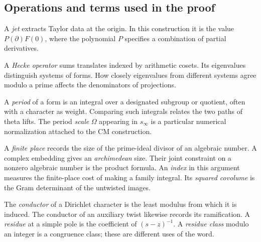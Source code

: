 \documentclass[11pt,letterpaper]{article}
\begin{document}
\subsection*{Operations and terms used in the proof}
A \emph{jet} extracts Taylor data at the origin. In this construction it is the value \(P(\partial)F(0)\), where the polynomial \(P\) specifies a combination of partial derivatives.

A \emph{Hecke operator} sums translates indexed by arithmetic cosets. Its eigenvalues distinguish systems of forms. How closely eigenvalues from different systems agree modulo a prime affects the denominators of projections.

A \emph{period} of a form is an integral over a designated subgroup or quotient, often with a character as weight. Comparing such integrals relates the two paths of theta lifts. The period \emph{scale} \(\Omega\) appearing in \(s_\infty\) is a particular numerical normalization attached to the CM construction.


A \emph{finite place} records the size of the prime-ideal divisor of an algebraic number. A complex embedding gives an \emph{archimedean} size. Their joint constraint on a nonzero algebraic number is the product formula. An \emph{index} in this argument measures the finite-place cost of making a family integral. Its \emph{squared covolume} is the Gram determinant of the untwisted images.

The \emph{conductor} of a Dirichlet character is the least modulus from which it is induced. The conductor of an auxiliary twist likewise records its ramification. A \emph{residue} at a simple pole is the coefficient of \((s-z)^{-1}\). A \emph{residue class} modulo an integer is a congruence class; these are different uses of the word.
\end{document}
